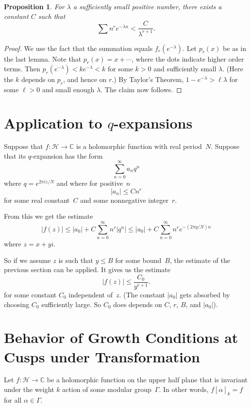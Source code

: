 \documentclass {amsart}
\theoremstyle{plain}
\newtheorem{proposition}{Proposition}
\theoremstyle{definition}
\theoremstyle{remark}
\newcommand{\bC}{{\mathbb{C}}}
\newcommand{\h}{{\mathcal{H}}}
\begin{document}
\begin{proposition}
  For $\lambda$ a sufficiently small positive number, there exists a constant $C$ such that
  \[
  \sum n^r e^{-\lambda n} < \frac{C}{\lambda^{r+1}}.
  \]
\end{proposition}

\begin{proof}
  We use the fact that the summation equals $f_r(e^{-\lambda})$. Let $p_r(x)$ be as in the last lemma. Note that $p_r(x) = x + \cdots$, where the dots indicate higher order terms. Then $p_r(e^{-\lambda}) < k e^{-\lambda} < k$ for some $k > 0$ and sufficiently small $\lambda$. (Here the $k$ depends on $p_r$, and hence on $r$.) By Taylor's Theorem, $1-e^{-\lambda} > \ell \lambda$ for some $\ell > 0$ and small enough $\lambda$. The claim now follows.
\end{proof}


\section {Application to $q$-expansions}

Suppose that $f \colon \h \to \bC$ is a holomorphic function with real period~$N$.
Suppose that its $q$-expansion has the form
$$
\sum_{n=0}^\infty a_n  q^n
$$
where $q = e^{2 \pi i z  / N}$ and where for positive~$n$
$$
|a_n| \le C n^r
$$
for some real constant~$C$ and some nonnegative integer~$r$.

From this we get the estimate
$$
|f(z)| \le |a_0| + C \sum_{n=0}^\infty  n^r  \left|q^n \right| \le 
|a_0| + C \sum_{n=0}^\infty  n^r  e^{- (2 \pi y / N) n}
$$
where $z = x + y i$.

So if we assume $z$ is such that $y \le B$ for some bound~$B$, the estimate of the
previous section can be applied. It gives us the estimate
$$
|f(z)|  \le \frac{C_0}{y^{r+1}}.
$$
for some constant $C_0$ independent of~$z$.
(The constant $|a_0|$ gets absorbed by choosing $C_0$ sufficiently large.
So $C_0$ does depends on $C$, $r$, $B$, and $|a_0|$).





\section {Behavior of Growth Conditions at Cusps under Transformation}

Let $f: \h \to \bC$ be a holomorphic function on the upper half plane that is
invariant under the weight $k$ action of some modular group~$\Gamma$.
In other words, $f [\alpha]_k = f$ for all $\alpha \in\Gamma$. 
\end{document}
